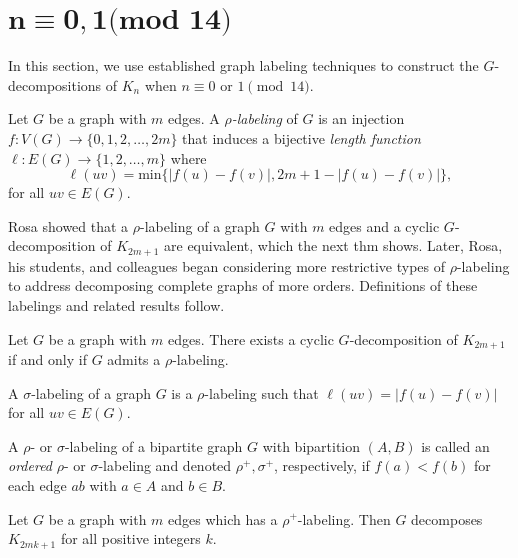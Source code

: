 \chapter{$\mathbf{n\equiv 0,1\textbf{(mod 14)}}$}
\label{cyclic}

In this section, we use established graph labeling techniques to construct the $G$-decompositions of $K_n$ when $n \equiv 0 \textrm{ or } 1 \pmod{14}$. 



\begin{definition} \label{def:rho} 
 Let $G$ be a graph with $m$ edges.  A \textit{$\rho$-labeling} of $G$ is an injection $f: V(G) \rightarrow \{0,1,2, \dots, 2m\}$ that induces a bijective \textit{length function $\ell: E(G) \rightarrow \{1,2, \dots, m\}$} where 
    $$
    \ell(uv) = \text{min}\{|f(u)-f(v)|,2m+1-|f(u)-f(v)|\},
    $$
for all  $uv \in E(G)$.
\end{definition}

Rosa showed that a $\rho$-labeling of a graph $G$ with $m$ edges and a cyclic $G$-decomposition of $K_{2m+1}$ are equivalent, which the next thm shows. Later, Rosa, his students, and colleagues began considering more restrictive types of $\rho$-labeling to address decomposing complete graphs of more orders. Definitions of these labelings and related results follow.

\begin{thm}\label{thm:Rhosa}  
Let $G$ be a graph with $m$ edges.  There exists a cyclic $G$-decomposition of $K_{2m+1}$ if and only if $G$ admits a $\rho$-labeling.
\end{thm}

\begin{definition} \label{def:sigma} 
A $\sigma$-labeling of a graph $G$ is a $\rho$-labeling such that $\ell(uv) = |f(u) - f(v)|$ for all $uv \in E(G).$
\end{definition}

\begin{definition} \label{def:rho and sigma ordered def} 
A $\rho$- or $\sigma$-labeling of a bipartite graph $G$ with bipartition $(A,B)$ is called an \emph{ordered} $\rho$- or $\sigma$-labeling and denoted $\rho^+,\sigma^+$, respectively, if $f(a) < f(b)$ for each edge $ab$ with $a \in A$ and $b \in B$.
\end{definition}

\begin{thm} \label{thm:rho plus}
Let $G$ be a graph with $m$ edges which has a $\rho^+$-labeling. Then $G$ decomposes $K_{2mk+1}$ for all positive integers $k$.
\end{thm}

